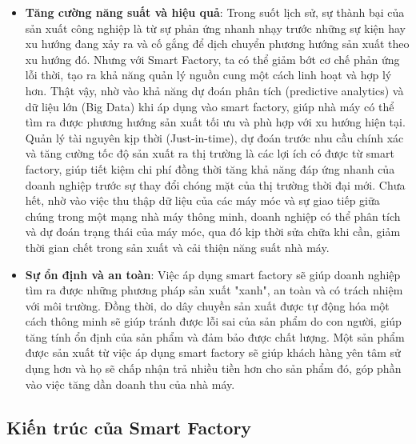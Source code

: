 \begin{itemize}
    \item \textbf{Tăng cường năng suất và hiệu quả}:  Trong suốt lịch sử, sự thành bại của sản xuất công nghiệp là từ sự phản ứng nhanh nhạy trước những sự kiện hay xu hướng đang xảy ra và cố gắng để dịch chuyển phương hướng sản xuất theo xu hướng đó. Nhưng với Smart Factory, ta có thể giảm bớt cơ chế phản ứng lỗi thời, tạo ra khả năng quản lý nguồn cung một cách linh hoạt và hợp lý hơn. Thật vậy, nhờ vào khả năng dự đoán phân tích (predictive analytics) và dữ liệu lớn (Big Data) khi áp dụng vào smart factory, giúp nhà máy có thể tìm ra được phương hướng sản xuất tối ưu và phù hợp với xu hướng hiện tại. Quản lý tài nguyên kịp thời (Just-in-time), dự đoán trước nhu cầu chính xác và tăng cường tốc độ sản xuất ra thị trường là các lợi ích có được từ smart factory, giúp tiết kiệm chi phí đồng thời tăng khả năng đáp ứng nhanh của doanh nghiệp trước sự thay đổi chóng mặt của thị trường thời đại mới. Chưa hết, nhờ vào việc thu thập dữ liệu của các máy móc và sự giao tiếp giữa chúng trong một mạng nhà máy thông minh, doanh nghiệp có thể phân tích và dự đoán trạng thái của máy móc, qua đó kịp thời sửa chữa khi cần, giảm thời gian chết trong sản xuất và cải thiện năng suất nhà máy.
    \item \textbf{Sự ổn định và an toàn}: Việc áp dụng smart factory sẽ giúp doanh nghiệp tìm ra được những phương pháp sản xuất "xanh", an toàn và có trách nhiệm với môi trường. Đồng thời, do dây chuyền sản xuất được tự động hóa một cách thông minh sẽ giúp tránh được lỗi sai của sản phẩm do con người, giúp tăng tính ổn định của sản phẩm và đảm bảo được chất lượng. Một sản phẩm được sản xuất từ việc áp dụng smart factory sẽ giúp khách hàng yên tâm sử dụng hơn và họ sẽ chấp nhận trả nhiều tiền hơn cho sản phẩm đó, góp phần vào việc tăng dần doanh thu của nhà máy.
    
\end{itemize}

\subsection{Kiến trúc của Smart Factory}

